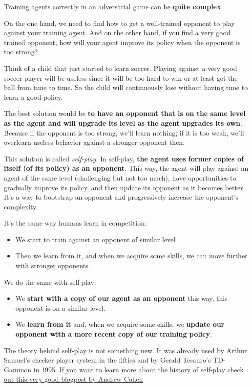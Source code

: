 \documentclass[11pt,a4paper]{article}
\begin{document}
Training agents correctly in an adversarial game can be \textbf{quite complex}.

On the one hand, we need to find how to get a well-trained opponent to play against your training agent. And on the other hand, if you find a very good trained opponent, how will your agent improve its policy when the opponent is too strong?

Think of a child that just started to learn soccer. Playing against a very good soccer player will be useless since it will be too hard to win or at least get the ball from time to time. So the child will continuously lose without having time to learn a good policy.

The best solution would be \textbf{to have an opponent that is on the same level as the agent and will upgrade its level as the agent upgrades its own}. Because if the opponent is too strong, we'll learn nothing; if it is too weak, we'll overlearn useless behavior against a stronger opponent then.

This solution is called \emph{self-play}. In self-play, \textbf{the agent uses former copies of itself (of its policy) as an opponent}. This way, the agent will play against an agent of the same level (challenging but not too much), have opportunities to gradually improve its policy, and then update its opponent as it becomes better. It's a way to bootstrap an opponent and progressively increase the opponent's complexity.

It's the same way humans learn in competition:

\begin{itemize}
\tightlist
\item
  We start to train against an opponent of similar level
\item
  Then we learn from it, and when we acquire some skills, we can move further with stronger opponents.
\end{itemize}

We do the same with self-play:

\begin{itemize}
\tightlist
\item
  We \textbf{start with a copy of our agent as an opponent} this way, this opponent is on a similar level.
\item
  We \textbf{learn from it} and, when we acquire some skills, we \textbf{update our opponent with a more recent copy of our training policy}.
\end{itemize}

The theory behind self-play is not something new. It was already used by Arthur Samuel's checker player system in the fifties and by Gerald Tesauro's TD-Gammon in 1995. If you want to learn more about the history of self-play \href{https://blog.unity.com/technology/training-intelligent-adversaries-using-self-play-with-ml-agents}{check out this very good blogpost by Andrew Cohen}
\end{document}
